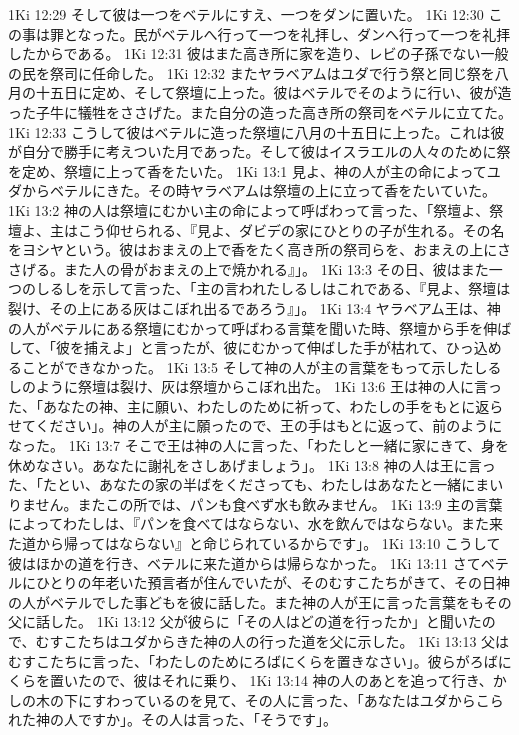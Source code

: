 1Ki 12:29  そして彼は一つをベテルにすえ、一つをダンに置いた。
1Ki 12:30  この事は罪となった。民がベテルへ行って一つを礼拝し、ダンへ行って一つを礼拝したからである。
1Ki 12:31  彼はまた高き所に家を造り、レビの子孫でない一般の民を祭司に任命した。
1Ki 12:32  またヤラベアムはユダで行う祭と同じ祭を八月の十五日に定め、そして祭壇に上った。彼はベテルでそのように行い、彼が造った子牛に犠牲をささげた。また自分の造った高き所の祭司をベテルに立てた。
1Ki 12:33  こうして彼はベテルに造った祭壇に八月の十五日に上った。これは彼が自分で勝手に考えついた月であった。そして彼はイスラエルの人々のために祭を定め、祭壇に上って香をたいた。
1Ki 13:1  見よ、神の人が主の命によってユダからベテルにきた。その時ヤラベアムは祭壇の上に立って香をたいていた。
1Ki 13:2  神の人は祭壇にむかい主の命によって呼ばわって言った、「祭壇よ、祭壇よ、主はこう仰せられる、『見よ、ダビデの家にひとりの子が生れる。その名をヨシヤという。彼はおまえの上で香をたく高き所の祭司らを、おまえの上にささげる。また人の骨がおまえの上で焼かれる』」。
1Ki 13:3  その日、彼はまた一つのしるしを示して言った、「主の言われたしるしはこれである、『見よ、祭壇は裂け、その上にある灰はこぼれ出るであろう』」。
1Ki 13:4  ヤラベアム王は、神の人がベテルにある祭壇にむかって呼ばわる言葉を聞いた時、祭壇から手を伸ばして、「彼を捕えよ」と言ったが、彼にむかって伸ばした手が枯れて、ひっ込めることができなかった。
1Ki 13:5  そして神の人が主の言葉をもって示したしるしのように祭壇は裂け、灰は祭壇からこぼれ出た。
1Ki 13:6  王は神の人に言った、「あなたの神、主に願い、わたしのために祈って、わたしの手をもとに返らせてください」。神の人が主に願ったので、王の手はもとに返って、前のようになった。
1Ki 13:7  そこで王は神の人に言った、「わたしと一緒に家にきて、身を休めなさい。あなたに謝礼をさしあげましょう」。
1Ki 13:8  神の人は王に言った、「たとい、あなたの家の半ばをくださっても、わたしはあなたと一緒にまいりません。またこの所では、パンも食べず水も飲みません。
1Ki 13:9  主の言葉によってわたしは、『パンを食べてはならない、水を飲んではならない。また来た道から帰ってはならない』と命じられているからです」。
1Ki 13:10  こうして彼はほかの道を行き、ベテルに来た道からは帰らなかった。
1Ki 13:11  さてベテルにひとりの年老いた預言者が住んでいたが、そのむすこたちがきて、その日神の人がベテルでした事どもを彼に話した。また神の人が王に言った言葉をもその父に話した。
1Ki 13:12  父が彼らに「その人はどの道を行ったか」と聞いたので、むすこたちはユダからきた神の人の行った道を父に示した。
1Ki 13:13  父はむすこたちに言った、「わたしのためにろばにくらを置きなさい」。彼らがろばにくらを置いたので、彼はそれに乗り、
1Ki 13:14  神の人のあとを追って行き、かしの木の下にすわっているのを見て、その人に言った、「あなたはユダからこられた神の人ですか」。その人は言った、「そうです」。
